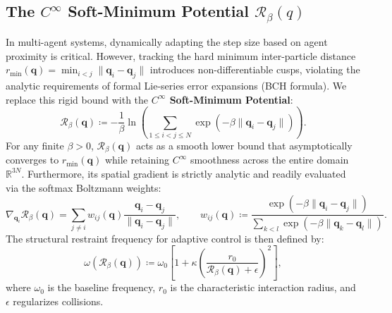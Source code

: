 \documentclass[11pt,a4paper,reqno]{article}
\theoremstyle{plain}
\theoremstyle{definition}
\theoremstyle{remark}
\numberwithin{equation}{section}
\begin{document}
\subsection{The \texorpdfstring{$C^\infty$}{C-infinity} Soft-Minimum Potential \texorpdfstring{$\mathcal{R}_\beta(q)$}{R\_beta(q)}}
\label{subsec:soft_minimum}
In multi-agent systems, dynamically adapting the step size based on agent proximity is critical. However, tracking the hard minimum inter-particle distance $r_{\min}(\bm{q}) = \min_{i<j} \|\bm{q}_i - \bm{q}_j\|$ introduces non-differentiable cusps, violating the analytic requirements of formal Lie-series error expansions (BCH formula). We replace this rigid bound with the \textbf{$C^\infty$ Soft-Minimum Potential}:
\begin{equation}
\mathcal{R}_\beta(\bm{q}) \coloneqq -\frac{1}{\beta} \ln \left( \sum_{1 \le i < j \le N} \exp\left( -\beta \|\bm{q}_i - \bm{q}_j\| \right) \right).
\label{eq:soft_min}
\end{equation}
For any finite $\beta > 0$, $\mathcal{R}_\beta(\bm{q})$ acts as a smooth lower bound that asymptotically converges to $r_{\min}(\bm{q})$ while retaining $C^\infty$ smoothness across the entire domain $\mathbb{R}^{3N}$. Furthermore, its spatial gradient is strictly analytic and readily evaluated via the softmax Boltzmann weights:
\begin{equation}
\nabla_{\bm{q}_i} \mathcal{R}_\beta(\bm{q}) = \sum_{j \neq i} w_{ij}(\bm{q}) \frac{\bm{q}_i - \bm{q}_j}{\|\bm{q}_i - \bm{q}_j\|}, \qquad w_{ij}(\bm{q}) \coloneqq \frac{\exp\left(-\beta \|\bm{q}_i - \bm{q}_j\|\right)}{\sum_{k < l} \exp\left(-\beta \|\bm{q}_k - \bm{q}_l\|\right)}.
\label{eq:soft_min_gradient}
\end{equation}
The structural restraint frequency for adaptive control is then defined by:
\begin{equation}
\omega(\mathcal{R}_\beta(\bm{q})) \coloneqq \omega_0 \left[ 1 + \kappa \left( \frac{r_0}{\mathcal{R}_\beta(\bm{q}) + \epsilon} \right)^2 \right],
\label{eq:adaptive_omega}
\end{equation}
where $\omega_0$ is the baseline frequency, $r_0$ is the characteristic interaction radius, and $\epsilon$ regularizes collisions.
\end{document}
